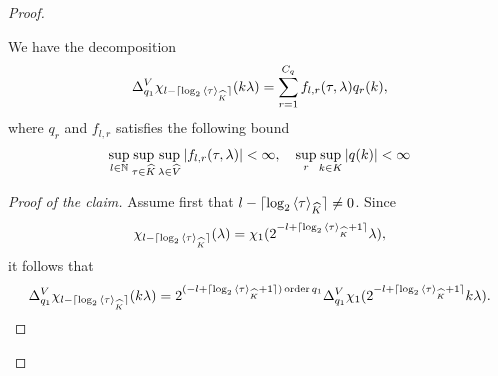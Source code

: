 \begin{proof}
\begin{description}
            \begin{claim}
                We have the decomposition
                \begin{align*}
                    \DifferenceOperator[\VectorSpace]{q_1} \chi_{l - \Ceiling{\log_2 \JapaneseBracket{\CompactGroup}{\tau}}}(k \lambda) = \sum_{r = 1}^{C_q} f_{l, r}(\tau, \lambda) q_r(k),
                \end{align*}
                where $q_r$ and $f_{l, r}$ satisfies the following bound
                \begin{align}
                    \sup_{l \in \N} \sup_{\tau \in \dualGroup{\CompactGroup}} \sup_{\lambda \in \dualGroup{\VectorSpace}} \abs{f_{l, r}(\tau, \lambda)} < \infty,\quad
                    \sup_{r} \sup_{k \in \CompactGroup} \abs{q(k)} < \infty
                    \label{eq:theorem:Littlewood-Paley_decomposition:claim_bound}
                \end{align}
            \end{claim}
            \begin{proof}[Proof of the claim]
                Assume first that $l - \Ceiling{\log_2 \JapaneseBracket{\CompactGroup}{\tau}} \neq 0$.
                Since
                \begin{align*}
                    \chi_{l - \Ceiling{\log_2 \JapaneseBracket{\CompactGroup}{\tau}}}(\lambda)
                    = \chi_1(2^{-l + \Ceiling{\log_2 \JapaneseBracket{\CompactGroup}{\tau} + 1}} \lambda),
                \end{align*}
                it follows that
                \begin{align*}
                    \DifferenceOperator[\VectorSpace]{q_1} \chi_{l - \Ceiling{\log_2 \JapaneseBracket{\CompactGroup}{\tau}}}(k \lambda)
                    =
                    2^{(-l + \Ceiling{\log_2 \JapaneseBracket{\CompactGroup}{\tau} + 1}) \order{q_1}}
                    \DifferenceOperator[\VectorSpace]{q_1} \chi_1(2^{-l + \Ceiling{\log_2 \JapaneseBracket{\CompactGroup}{\tau} + 1}} k \lambda).
                \end{align*}


\end{proof}
\end{description}
\end{proof}
